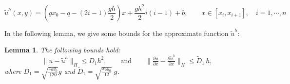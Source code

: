 \documentclass[11pt]{article}
\newcommand\pder[2][]{\ensuremath{\tfrac{\partial#1}{\partial#2}}}
\newtheorem{Lemma}{Lemma}
\begin{document}
\vspace{-12pt}

\centering %
\begin{equation}\label{uhtilde}
{\widetilde{u}^h}(x,y)=\left(gx_0-q-(2i-1)\frac{gh}{2} \right)x+\frac{gh^2}{2} i (i-1)+b,\qquad x\in [x_i,x_{i+1}], \quad i=1,\cdots,n
\end{equation}




In the following lemma, we give some bounds for the approximate  function ${\widetilde{u}^h}:$

 
  \begin{Lemma} \label{Cota u uh tilde} The following  bounds hold:
    		\[\lVert u-{\widetilde{u}^h} \rVert _H \leq  D_1 h^2, \qquad \text{and}\qquad
\lVert \pder[u]{x}-\pder[{\widetilde{u}^h}]{x} \rVert _H \leq \widetilde{D}_{1}\, h, \]
    		where $D_1=\sqrt{\frac{x_0 y_0 }{120}} g $ 
   and $\widetilde{D}_1=\sqrt{\frac{x_0 y_0}{12}}\; g$.
    
    \end{Lemma}
\end{document}
